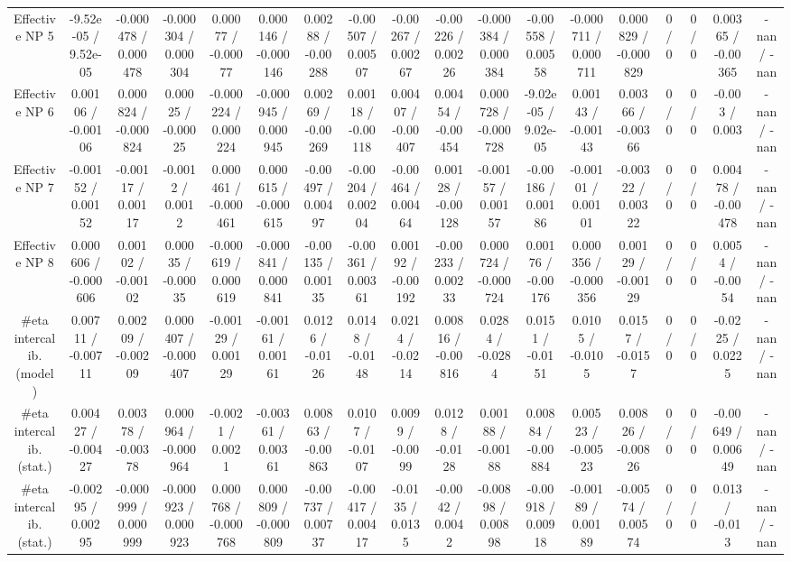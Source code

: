 \documentclass[10pt]{article}
\begin{document}
\begin{table}[htbp]
\begin{center}
\begin{tabular}{|c|c|c|c|c|c|c|c|c|c|c|c|c|c|c|c|c|c|}
  Effective NP 5 & -9.52e-05 / 9.52e-05 & -0.000478 / 0.000478 & -0.000304 / 0.000304 & 0.00077 / -0.00077 & 0.000146 / -0.000146 & 0.00288 / -0.00288 & -0.00507 / 0.00507 & -0.00267 / 0.00267 & -0.00226 / 0.00226 & -0.000384 / 0.000384 & -0.00558 / 0.00558 & -0.000711 / 0.000711 & 0.000829 / -0.000829 & 0 / 0 & 0 / 0 & 0.00365 / -0.00365 & -nan / -nan \\ 
  Effective NP 6 & 0.00106 / -0.00106 & 0.000824 / -0.000824 & 0.00025 / -0.00025 & -0.000224 / 0.000224 & -0.000945 / 0.000945 & 0.00269 / -0.00269 & 0.00118 / -0.00118 & 0.00407 / -0.00407 & 0.00454 / -0.00454 & 0.000728 / -0.000728 & -9.02e-05 / 9.02e-05 & 0.00143 / -0.00143 & 0.00366 / -0.00366 & 0 / 0 & 0 / 0 & -0.003 / 0.003 & -nan / -nan \\ 
  Effective NP 7 & -0.00152 / 0.00152 & -0.00117 / 0.00117 & -0.0012 / 0.0012 & 0.000461 / -0.000461 & 0.000615 / -0.000615 & -0.00497 / 0.00497 & -0.00204 / 0.00204 & -0.00464 / 0.00464 & 0.00128 / -0.00128 & -0.00157 / 0.00157 & -0.00186 / 0.00186 & -0.00101 / 0.00101 & -0.00322 / 0.00322 & 0 / 0 & 0 / 0 & 0.00478 / -0.00478 & -nan / -nan \\ 
  Effective NP 8 & 0.000606 / -0.000606 & 0.00102 / -0.00102 & 0.00035 / -0.00035 & -0.000619 / 0.000619 & -0.000841 / 0.000841 & -0.00135 / 0.00135 & -0.00361 / 0.00361 & 0.00192 / -0.00192 & -0.00233 / 0.00233 & 0.000724 / -0.000724 & 0.00176 / -0.00176 & 0.000356 / -0.000356 & 0.00129 / -0.00129 & 0 / 0 & 0 / 0 & 0.0054 / -0.0054 & -nan / -nan \\ 
  #eta intercalib. (model) & 0.00711 / -0.00711 & 0.00209 / -0.00209 & 0.000407 / -0.000407 & -0.00129 / 0.00129 & -0.00161 / 0.00161 & 0.0126 / -0.0126 & 0.0148 / -0.0148 & 0.0214 / -0.0214 & 0.00816 / -0.00816 & 0.0284 / -0.0284 & 0.0151 / -0.0151 & 0.0105 / -0.0105 & 0.0157 / -0.0157 & 0 / 0 & 0 / 0 & -0.0225 / 0.0225 & -nan / -nan \\ 
  #eta intercalib. (stat.) & 0.00427 / -0.00427 & 0.00378 / -0.00378 & 0.000964 / -0.000964 & -0.0021 / 0.0021 & -0.00361 / 0.00361 & 0.00863 / -0.00863 & 0.0107 / -0.0107 & 0.0099 / -0.0099 & 0.0128 / -0.0128 & 0.00188 / -0.00188 & 0.00884 / -0.00884 & 0.00523 / -0.00523 & 0.00826 / -0.00826 & 0 / 0 & 0 / 0 & -0.00649 / 0.00649 & -nan / -nan \\ 
  #eta intercalib. (stat.) & -0.00295 / 0.00295 & -0.000999 / 0.000999 & -0.000923 / 0.000923 & 0.000768 / -0.000768 & 0.000809 / -0.000809 & -0.00737 / 0.00737 & -0.00417 / 0.00417 & -0.0135 / 0.0135 & -0.0042 / 0.0042 & -0.00898 / 0.00898 & -0.00918 / 0.00918 & -0.00189 / 0.00189 & -0.00574 / 0.00574 & 0 / 0 & 0 / 0 & 0.013 / -0.013 & -nan / -nan \\ 

\end{tabular}
\end{center}
\end{table}
\end{document}
